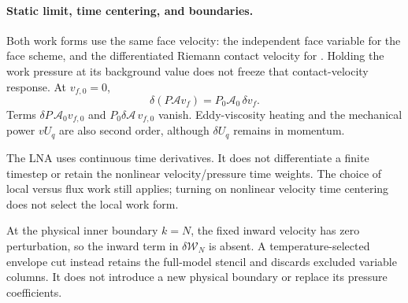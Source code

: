 \documentclass[11pt]{article}
\newenvironment{equationblock}{%
  \par\noindent\begin{minipage}{\linewidth}%
}{\end{minipage}\par\addvspace{12pt}}
\newcommand{\code}[1]{\texttt{\detokenize{#1}}}
\begin{document}
\begin{equationblock}
\paragraph{Static limit, time centering, and boundaries.}
Both work forms use the same face velocity: the independent face variable
for the face scheme, and the differentiated Riemann contact velocity for
\code{u_flag}. Holding the work pressure at its background value does not
freeze that contact-velocity response. At $v_{f,0}=0$,
\begin{equation}
  \delta(P\mathcal A v_f)=P_0\mathcal A_0\,\delta v_f.
\end{equation}
Terms $\delta P\,\mathcal A_0v_{f,0}$ and
$P_0\delta\mathcal A\,v_{f,0}$ vanish. Eddy-viscosity heating and the
mechanical power $vU_q$ are also second order, although
$\delta U_q$ remains in momentum.

The LNA uses continuous time derivatives. It does not differentiate a
finite timestep or retain the nonlinear velocity/pressure time weights.
The choice of local versus flux work still applies; turning on nonlinear
velocity time centering does not select the local work form.

At the physical inner boundary $k=N$, the fixed inward velocity has
zero perturbation, so the inward term in $\delta\mathcal W_N$ is absent.
A temperature-selected envelope cut instead retains the full-model
stencil and discards excluded variable columns. It does not introduce
a new physical boundary or replace its pressure coefficients.
\end{equationblock}
\end{document}
